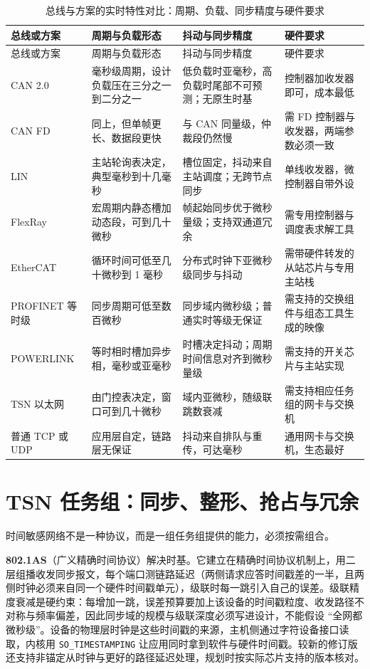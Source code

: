 \documentclass[12pt,a4paper,fontset=fandol]{ctexbook}
\newcommand{\Tp}[1]{\texttt{#1}}
\newcommand{\Bk}{\discretionary{}{}{}}
\begin{document}
\begin{longtable}{>{\raggedright\arraybackslash}p{} >{\raggedright\arraybackslash}p{} >{\raggedright\arraybackslash}p{} >{\raggedright\arraybackslash}p{}}
\caption{总线与方案的实时特性对比：周期、负载、同步精度与硬件要求}\label{tab:ch12-bus-traits}\\
\toprule
总线或方案 & 周期与负载形态 & 抖动与同步精度 & 硬件要求 \\
\midrule
\endfirsthead
\toprule
总线或方案 & 周期与负载形态 & 抖动与同步精度 & 硬件要求 \\
\midrule
\endhead
\bottomrule
\endfoot
\endlastfoot
CAN 2.0 & 毫秒级周期，设计负载压在三分之一到二分之一 & 低负载时亚毫秒，高负载时尾部不可预测；无原生时基 & 控制器加收发器即可，成本最低 \\
CAN FD & 同上，但单帧更长、数据段更快 & 与 CAN 同量级，仲裁段仍然慢 & 需 FD 控制器与收发器，两端参数必须一致 \\
LIN & 主站轮询表决定，典型毫秒到十几毫秒 & 槽位固定，抖动来自主站调度；无跨节点同步 & 单线收发器，微控制器自带外设 \\
FlexRay & 宏周期内静态槽加动态段，可到几十微秒 & 帧起始同步优于微秒量级；支持双通道冗余 & 需专用控制器与调度表求解工具 \\
EtherCAT & 循环时间可低至几十微秒到 1 毫秒 & 分布式时钟下亚微秒级同步与抖动 & 需带硬件转发的从站芯片与专用主站栈 \\
PROFINET 等时级 & 同步周期可低至数百微秒 & 同步域内微秒级；普通实时等级无保证 & 需支持的交换组件与组态工具生成的映像 \\
POWER{\Bk}LINK & 等时相时槽加异步相，毫秒或亚毫秒 & 时槽决定抖动；周期时间信息对齐到微秒量级 & 需支持的开关芯片与主站实现 \\
TSN 以太网 & 由门控表决定，窗口可到几十微秒 & 域内亚微秒，随级联跳数衰减 & 需支持相应任务组的网卡与交换机 \\
普通 TCP 或 UDP & 应用层自定，链路层无保证 & 抖动来自排队与重传，可达毫秒 & 通用网卡与交换机，生态最好 \\
\end{longtable}

\section{TSN 任务组：同步、整形、抢占与冗余}

时间敏感网络不是一种协议，而是一组任务组提供的能力，必须按需组合。

\textbf{802.1AS}（广义精确时间协议）解决时基。它建立在精确时间协议机制上，用二层组播收发同步报文，每个端口测链路延迟（两侧请求应答时间戳差的一半，且两侧时钟必须来自同一个硬件时间戳单元），级联时每一跳引入自己的误差。级联精度衰减是硬约束：每增加一跳，误差预算要加上该设备的时间戳粒度、收发路径不对称与频率偏差，因此同步域的规模与级联深度必须写进设计，不能假设 ``全网都微秒级''。设备的物理层时钟是这些时间戳的来源，主机侧通过字符设备接口读取，内核用 \Tp{SO\_TIMESTAMPING} 让应用同时拿到软件与硬件时间戳。较新的修订版还支持非锚定从时钟与更好的路径延迟处理，规划时按实际芯片支持的版本核对。
\end{document}
